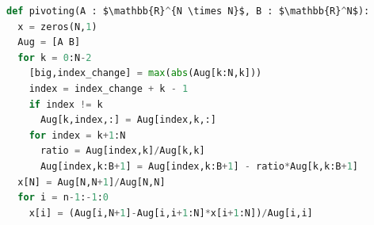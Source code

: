 \documentclass[book.tex]{subfiles}
\begin{document}
\begin{lstlisting}[language=python]
def pivoting(A : $\mathbb{R}^{N \times N}$, B : $\mathbb{R}^N$):
  x = zeros(N,1)
  Aug = [A B]
  for k = 0:N-2
    [big,index_change] = max(abs(Aug[k:N,k]))
    index = index_change + k - 1
    if index != k
      Aug[k,index,:] = Aug[index,k,:]
    for index = k+1:N
      ratio = Aug[index,k]/Aug[k,k]
      Aug[index,k:B+1] = Aug[index,k:B+1] - ratio*Aug[k,k:B+1]
  x[N] = Aug[N,N+1]/Aug[N,N]
  for i = n-1:-1:0
    x[i] = (Aug[i,N+1]-Aug[i,i+1:N]*x[i+1:N])/Aug[i,i]
\end{lstlisting}

\end{document}
